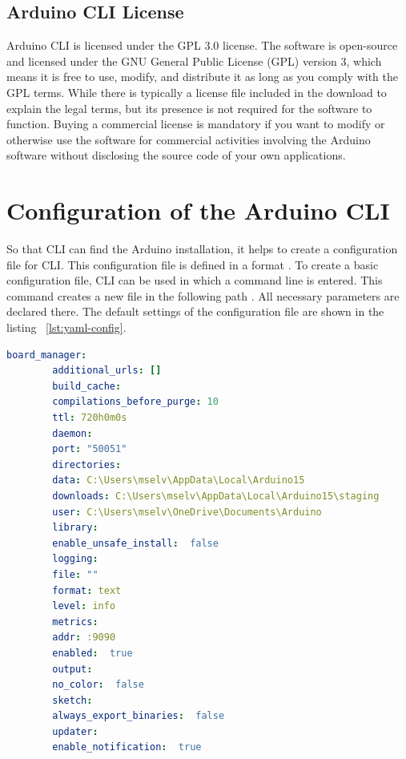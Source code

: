 \subsection{Arduino CLI License}
Arduino CLI is licensed under the GPL 3.0 license. The software is open-source and licensed under the GNU General Public License (GPL) version 3, which means it is free to use, modify, and distribute it as long as you comply with the GPL terms. While there is typically a license file included in the download to explain the legal terms, but its presence is not required for the software to function. Buying a commercial license is mandatory if you want to modify or otherwise use the software for commercial activities involving the Arduino software without disclosing the source code of your own applications. \cite{ArduinoCLIGit:2024}


\section{Configuration of the Arduino CLI}
So that CLI can find the Arduino installation, it helps to create a configuration file for CLI. This configuration file is defined in a format . To create a basic configuration file, CLI can be used in which a command line
is entered. This command creates a new file  in the following path . All necessary parameters are declared there. The default settings of the configuration file are shown in the listing ~\ref{lst:yaml-config}. 

%

\begin{code}
\begin{center}
\begin{lstlisting}[language=yaml,caption={Default settings of the configuration file},label={lst:yaml-config}]
		board_manager:
		additional_urls: []
		build_cache:
		compilations_before_purge: 10
		ttl: 720h0m0s
		daemon:
		port: "50051"
		directories:
		data: C:\Users\mselv\AppData\Local\Arduino15
		downloads: C:\Users\mselv\AppData\Local\Arduino15\staging
		user: C:\Users\mselv\OneDrive\Documents\Arduino
		library:
		enable_unsafe_install:  false
		logging:
		file: ""
		format: text
		level: info
		metrics:
		addr: :9090
		enabled:  true
		output:
		no_color:  false
		sketch:
		always_export_binaries:  false
		updater:
		enable_notification:  true
	\end{lstlisting}
\end{center}
\end{code}

